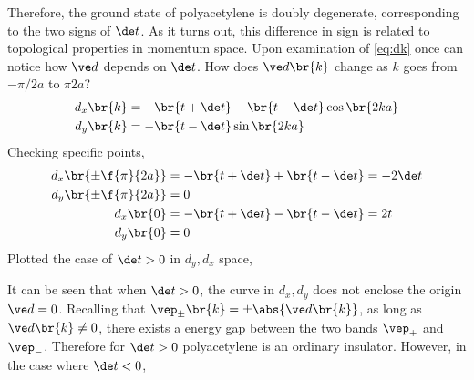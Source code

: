 \documentclass{article}
\begin{document}
Therefore, the ground state of polyacetylene is doubly degenerate, corresponding to the two signs of $\de t$. As it turns out, this difference in sign is related to topological properties in momentum space. Upon examination of \cref{eq:dk} once can notice how $\ve d$ depends on $\de t$. How does $\ve d\br{k}$ change as $k$ goes from $- \pi / 2a$ to $\pi  2a$?
\begin{align*}
\begin{split}
d_x \br{k} &= - \br{t + \de t} - \br{t - \de t} \cos\br{2 ka} \\
d_y \br{k} &= - \br{t - \de t} \sin\br{2 ka}
\end{split}
\end{align*}
Checking specific points,
\begin{align*}
d_x \br{\pm\f{\pi}{2a}} &= - \br{t + \de t} + \br{t - \de t} = - 2 \de t\\
d_y \br{\pm\f{\pi}{2a}} &= 0 \\
d_x \br{0} &= - \br{t + \de t} - \br{t - \de t} = 2 t\\
d_y \br{0} &= 0
\end{align*}
Plotted the case of $\de t >0$ in $d_y, d_x$ space,
\begin{center}
\end{center}
It can be seen that when $\de t > 0$, the curve in $d_x, d_y$ does not enclose the origin $\ve d = 0$. Recalling that $\vep_{\pm}\br{k} = \pm \abs{\ve d \br{k}}$, as long as $\ve d\br{k} \neq 0$, there exists a energy gap between the two bands $\vep_{+}$ and $\vep_{-}$. Therefore for $\de t > 0$ polyacetylene is an ordinary insulator. However, in the case where $\de t < 0$,
\begin{center}
\end{center}
\end{document}
